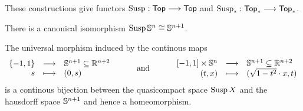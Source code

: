 \begin{definition}
\begin{minipage}{4cm}
\begin{center}
			\end{center}
		\end{minipage}

		These constructions give functors $\Susp: \ncat{Top} --> \ncat{Top}$ and $\Susp_{*}: \ncat{Top}_{*} --> \ncat{Top}_{*}$.
	\end{definition}

	\begin{lemma}
		There is a canonical isomorphism $\Susp \S^n \isom \S^{n+1}$.

	\end{lemma}
	\begin{sketch}
		The universal morphism induced by the continous maps
		\begin{equation*}
			\begin{array}{rcl}
				\{-1,1\} & \longrightarrow & \S^{n+1} \subseteq \R^{n+2}\\
				s & \longmapsto & (0,s)
			\end{array}
			\hspace{1cm}\text{and}\hspace{1cm}
			\begin{array}{rcl}
				{[-1,1]} \times \S^n & \longrightarrow & \S^{n+1} \subseteq \R^{n+2}\\
				(t,x) & \longmapsto & (\sqrt{1-t^2}\cdot x,t)
			\end{array}
		\end{equation*}
		is a continous bijection between the quasicompact space $\Susp X$ and the hausdorff space $\S^{n+1}$ and hence a homeomorphism.
	\end{sketch}

